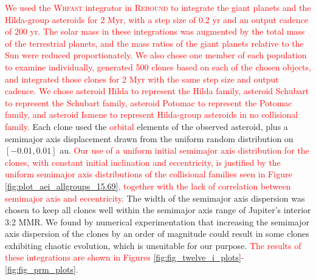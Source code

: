 \documentclass[a4paper,fleqn]{cas-sc}
\begin{document}
\begin{linenumbers}
\textcolor{red}{
We used the \textsc{Whfast} integrator in \textsc{Rebound} \citep{rebound} to integrate the giant planets and the Hilda-group asteroids for 2 Myr, with a step size of 0.2 yr and an output cadence of 200 yr.
The solar mass in these integrations was augmented by the total mass of the terrestrial planets, and the mass ratios of the giant planets relative to the Sun were reduced proportionately.
We also chose one member of each population to examine individually, generated 500 clones based on each of the chosen objects, and integrated those clones for 2 Myr with the same step size and output cadence.
We chose asteroid Hilda to represent the Hilda family, asteroid Schubart to represent the Schubart family, asteroid Potomac to represent the Potomac family, and asteroid Ismene to represent Hilda-group asteroids in no collisional family.
}
Each clone used the \textcolor{red}{orbital} elements of the observed asteroid, plus a semimajor axis displacement drawn from the uniform random distribution on $[-0.01,0.01]$ au.
\textcolor{red}{Our use of a uniform initial semimajor axis distribution for the clones, with constant initial inclination and eccentricity, is justified by the uniform semimajor axis distributions of the collisional families seen in Figure \ref{fig:plot_aei_allgroups_15.69}, together with the lack of correlation between semimajor axis and eccentricity.}
The width of the semimajor axis dispersion was chosen to keep all clones well within the semimajor axis range of Jupiter's interior 3:2 MMR.
We found by numerical experimentation that increasing the semimajor axis dispersion of the clones by an order of magnitude could result in some clones exhibiting chaotic evolution, which is unsuitable for our purpose.
\textcolor{red}{
The results of these integrations are shown in Figures \ref{fig:fig_twelve_i_plots}-\ref{fig:fig_prm_plots}.
}


\end{linenumbers}
\end{document}
